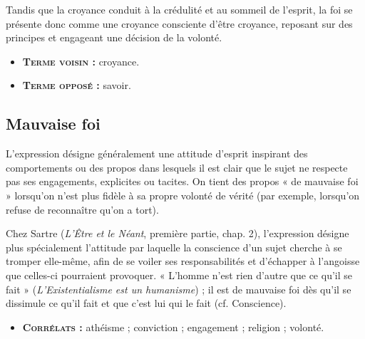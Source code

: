 Tandis que la croyance conduit à la
crédulité et au sommeil de l'esprit, la
foi se présente donc comme une
croyance consciente d’être croyance,
reposant sur des principes et engageant
une décision de la volonté.
{\footnotesize
\begin{itemize}[leftmargin=1cm, label=, itemsep=1pt]
\item {\bf \textsc{Terme voisin} :} croyance.
\item {\bf \textsc{Terme opposé} :} savoir.
\end{itemize}
}

\subsection{Mauvaise foi}

L'expression désigne généralement une
attitude d’esprit inspirant des comportements
ou des propos dans lesquels il est
clair que le sujet ne respecte pas ses
engagements, explicites ou tacites. On
tient des propos « de mauvaise foi » lorsqu'on
n'est plus fidèle à sa propre
volonté de vérité (par exemple, lorsqu'on
refuse de reconnaître qu’on a
tort).

Chez Sartre ({\it L'Être et le Néant}, première
partie, chap. 2), l'expression désigne
plus spécialement l'attitude par laquelle
la conscience d’un sujet cherche à se
tromper elle-même, afin de se voiler ses
responsabilités et d'échapper à l'angoisse
que celles-ci pourraient provoquer.
« L'homme n'est rien d'autre que
ce qu'il se fait » ({\it L'Existentialisme est un
humanisme}) ; il est de mauvaise foi dès
qu'il se dissimule ce qu'il fait et que c’est
lui qui le fait (cf. Conscience).
{\footnotesize
\begin{itemize}[leftmargin=1cm, label=, itemsep=1pt]
\item {\bf \textsc{Corrélats} :} athéisme ; conviction ;
engagement ; religion ;
volonté.
\end{itemize}
}

